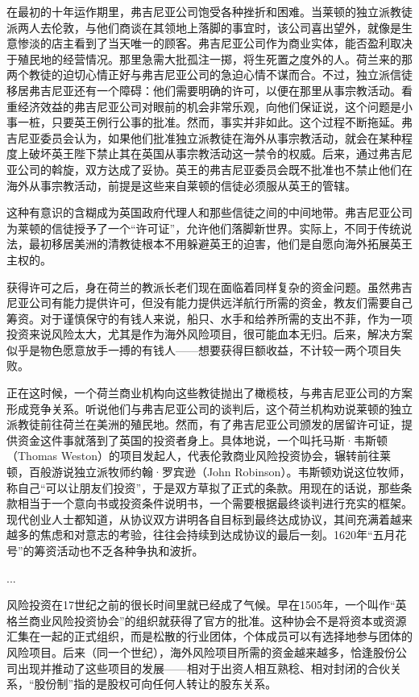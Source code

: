 \documentclass[12pt,oneside]{book}
\begin{document}
\begin{bookref}[frametitle={\cite{美国四百年}}]
在最初的十年运作期里，弗吉尼亚公司饱受各种挫折和困难。当莱顿的独立派教徒派两人去伦敦，与他们商谈在其领地上落脚的事宜时，该公司喜出望外，就像是生意惨淡的店主看到了当天唯一的顾客。弗吉尼亚公司作为商业实体，能否盈利取决于殖民地的经营情况。那里急需大批孤注一掷，将生死置之度外的人。荷兰来的那两个教徒的迫切心情正好与弗吉尼亚公司的急迫心情不谋而合。不过，独立派信徒移居弗吉尼亚还有一个障碍：他们需要明确的许可，以便在那里从事宗教活动。看重经济效益的弗吉尼亚公司对眼前的机会非常乐观，向他们保证说，这个问题是小事一桩，只要英王例行公事的批准。然而，事实并非如此。这个过程不断拖延。弗吉尼亚委员会认为，如果他们批准独立派教徒在海外从事宗教活动，就会在某种程度上破坏英王陛下禁止其在英国从事宗教活动这一禁令的权威。后来，通过弗吉尼亚公司的斡旋，双方达成了妥协。英王的弗吉尼亚委员会既不批准也不禁止他们在海外从事宗教活动，前提是这些来自莱顿的信徒必须服从英王的管辖。

这种有意识的含糊成为英国政府代理人和那些信徒之间的中间地带。弗吉尼亚公司为莱顿的信徒授予了一个“许可证”，允许他们落脚新世界。实际上，不同于传统说法，最初移居美洲的清教徒根本不用躲避英王的迫害，他们是自愿向海外拓展英王主权的。

获得许可之后，身在荷兰的教派长老们现在面临着同样复杂的资金问题。虽然弗吉尼亚公司有能力提供许可，但没有能力提供远洋航行所需的资金，教友们需要自己筹资。对于谨慎保守的有钱人来说，船只、水手和给养所需的支出不菲，作为一项投资来说风险太大，尤其是作为海外风险项目，很可能血本无归。后来，解决方案似乎是物色愿意放手一搏的有钱人——想要获得巨额收益，不计较一两个项目失败。

正在这时候，一个荷兰商业机构向这些教徒抛出了橄榄枝，与弗吉尼亚公司的方案形成竞争关系。听说他们与弗吉尼亚公司的谈判后，这个荷兰机构劝说莱顿的独立派教徒前往荷兰在美洲的殖民地。然而，有了弗吉尼亚公司颁发的居留许可证，提供资金这件事就落到了英国的投资者身上。具体地说，一个叫托马斯·韦斯顿（Thomas Weston）的项目发起人，代表伦敦商业风险投资协会，辗转前往莱顿，百般游说独立派牧师约翰·罗宾逊（John Robinson）。韦斯顿劝说这位牧师，称自己“可以让朋友们投资”，于是双方草拟了正式的条款。用现在的话说，那些条款相当于一个意向书或投资条件说明书，一个需要根据最终谈判进行充实的框架。现代创业人士都知道，从协议双方讲明各自目标到最终达成协议，其间充满着越来越多的焦虑和对意志的考验，往往会持续到达成协议的最后一刻。1620年“五月花号”的筹资活动也不乏各种争执和波折。

...

风险投资在17世纪之前的很长时间里就已经成了气候。早在1505年，一个叫作“英格兰商业风险投资协会”的组织就获得了官方的批准。这种协会不是将资本或资源汇集在一起的正式组织，而是松散的行业团体，个体成员可以有选择地参与团体的风险项目。后来（同一个世纪），海外风险项目所需的资金越来越多，恰逢股份公司出现并推动了这些项目的发展——相对于出资人相互熟稔、相对封闭的合伙关系，“股份制”指的是股权可向任何人转让的股东关系。


\end{bookref}
\end{document}
